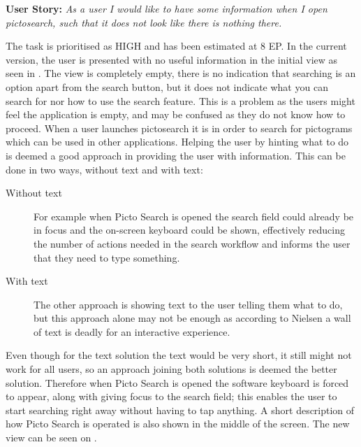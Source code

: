\textbf{User Story:} \textit{As a user I would like to have some information when I open pictosearch, such that it does not look like there is nothing there.} \newline

The task is prioritised as HIGH and has been estimated at 8 EP.
In the current version, the user is presented with no useful information in the initial view as seen in . 
The view is completely empty, there is no indication that searching is an option apart from the search button, but it does not indicate what you can search for nor how to use the search feature.
This is a problem as the users might feel the application is empty, and may be confused as they do not know how to proceed.
When a user launches pictosearch it is in order to search for pictograms which can be used in other applications.
Helping the user by hinting what to do is deemed a good approach in providing the user with information.
This can be done in two ways, without text and with text:
\begin{description}
    \item [Without text]
    For example when Picto Search is opened the search field could already be in focus and the on-screen keyboard could be shown, effectively reducing the number of actions needed in the search workflow and informs the user that they need to type something.
    \item [With text] 
    The other approach is showing text to the user telling them what to do, but this approach alone may not be enough as according to Nielsen \cite{nielsen2003usability} a wall of text is deadly for an interactive experience.
\end{description}

Even though for the text solution the text would be very short, it still might not work for all users, so an approach joining both solutions is deemed the better solution.
Therefore when Picto Search is opened the software keyboard is forced to appear, along with giving focus to the search field; this enables the user to start searching right away without having to tap anything.
A short description of how Picto Search is operated is also shown in the middle of the screen.
The new view can be seen on .

